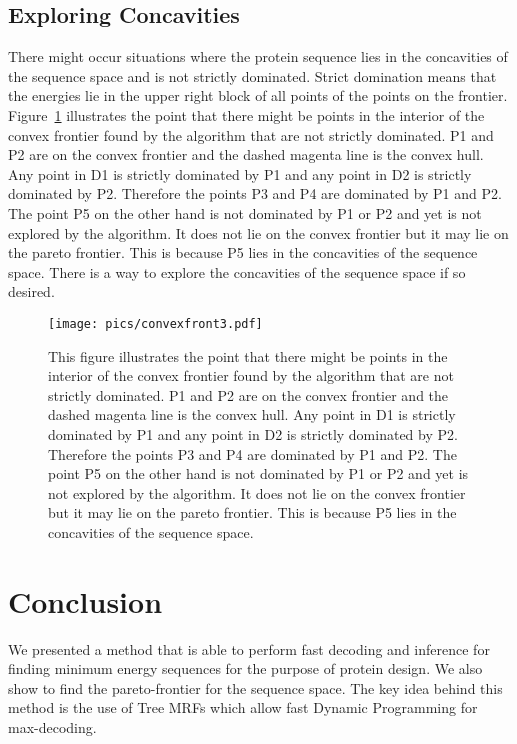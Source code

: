 \documentclass{article}
\begin{document}
\subsection{Exploring Concavities }
There might occur situations where the protein sequence lies in the concavities of the sequence space and is not strictly dominated. Strict domination means that the energies lie in the upper right block of all points of the points on the frontier. Figure~\ref{fig:cvxfront3} illustrates the point that there might be points in the interior of the convex frontier found by the algorithm that are not strictly dominated. P1 and P2 are on the convex frontier and the dashed magenta line is the convex hull. Any point in D1 is strictly dominated by P1 and any point in D2 is strictly dominated by P2. Therefore the points P3 and P4 are dominated by P1 and P2. The point P5 on the other hand is not dominated by P1 or P2 and yet is not explored by the algorithm. It does not lie on the convex frontier but it may lie on the pareto frontier. This is because P5 lies in the concavities of the sequence space. There is a way to explore the concavities of the sequence space if so desired. 


\begin{figure}[h!]
    \centering
    \texttt{[image: pics/convexfront3.pdf]}
    \caption{This figure illustrates the point that there might be points in the interior of the convex frontier found by the algorithm that are not strictly dominated. P1 and P2 are on the convex frontier and the dashed magenta line is the convex hull. Any point in D1 is strictly dominated by P1 and any point in D2 is strictly dominated by P2. Therefore the points P3 and P4 are dominated by P1 and P2. The point P5 on the other hand is not dominated by P1 or P2 and yet is not explored by the algorithm. It does not lie on the convex frontier but it may lie on the pareto frontier. This is because P5 lies in the concavities of the sequence space.}
    \label{fig:cvxfront3}
\end{figure}
\pagebreak






\section{Conclusion}
We presented a method that is able to perform fast decoding and inference for finding minimum energy sequences for the purpose of protein design. We also show to find the pareto-frontier for the sequence space. The key idea behind this method is the use of Tree MRFs which allow fast Dynamic Programming for max-decoding.
\end{document}
